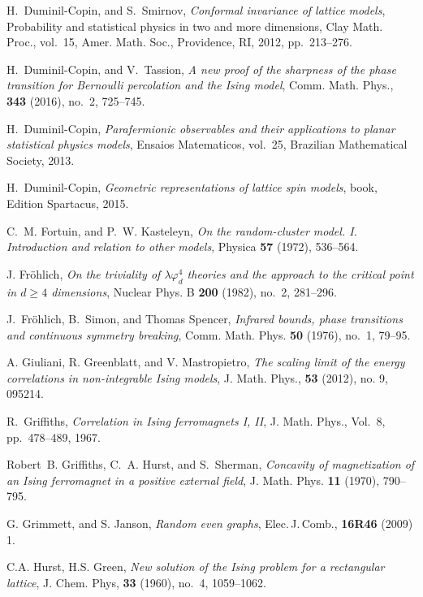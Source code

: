 \documentclass[a4paper,oneside,11pt]{article}
\begin{document}
\begin{thebibliography}{7}
H.~Duminil-Copin, and S.~Smirnov, \emph{Conformal invariance of lattice
  models}, \mbox{Probability} and statistical physics in two and more dimensions, Clay
  Math. Proc., vol.~15, Amer. Math. Soc., Providence, RI, 2012, pp.~213--276.

H.~Duminil-Copin, and V.~Tassion, \emph{A new proof of the sharpness of the
  phase \mbox{transition} for {B}ernoulli percolation and the {I}sing model},
  Comm. Math. Phys., {\bf 343} (2016), no.~2, 725--745.

H.~Duminil-Copin, \emph{Parafermionic observables and their applications to planar
  \mbox{statistical} physics models}, Ensaios Matematicos, vol.~25, Brazilian
  Mathematical Society, 2013.

H.~Duminil-Copin, \emph{Geometric representations of lattice spin models}, book, Edition
  Spartacus, 2015.

C.~M. Fortuin, and P.~W. Kasteleyn, \emph{On the random-cluster model. {I}.
  {I}ntroduction and relation to other models}, Physica \textbf{57} (1972),
  536--564.
  
J. Fr{\"o}hlich, \emph{On the triviality of $\lambda \varphi^{4}_{d}$
  theories and the approach to the critical point in $d\ge4$ dimensions},
  Nuclear Phys. B \textbf{200} (1982), no.~2, 281--296. 

J.~Fr{{\"o}}hlich, B.~Simon, and Thomas Spencer, \emph{Infrared bounds, phase
  transitions and continuous symmetry breaking}, Comm. Math. Phys. \textbf{50}
  (1976), no.~1, 79--95. 

A. Giuliani, R. Greenblatt, and V. Mastropietro, {\em The scaling limit of the energy correlations in non-integrable Ising models}, {J. Math. Phys.},
{\bf 53} (2012), no. 9, 095214.

R.~Griffiths, {\em Correlation in {I}sing ferromagnets {I}, {II}}, J. Math. Phys., Vol.~8, pp.~478--489, 1967.

Robert~B. Griffiths, C.~A. Hurst, and S.~Sherman, \emph{Concavity of
  magnetization of an {I}sing ferromagnet in a positive external field}, J.
  Math. Phys. \textbf{11} (1970), 790--795.
  
  G. Grimmett, and S. Janson, {\em Random even graphs},
{Elec.\,J.\,Comb.},
{\bf 16R46} (2009) 1.

 C.A. Hurst, H.S. Green, {\em New solution of the Ising problem for a rectangular lattice}, J. Chem. Phys,
{\bf 33}
(1960), no.~4,
1059--1062.


\end{thebibliography}
\end{document}
